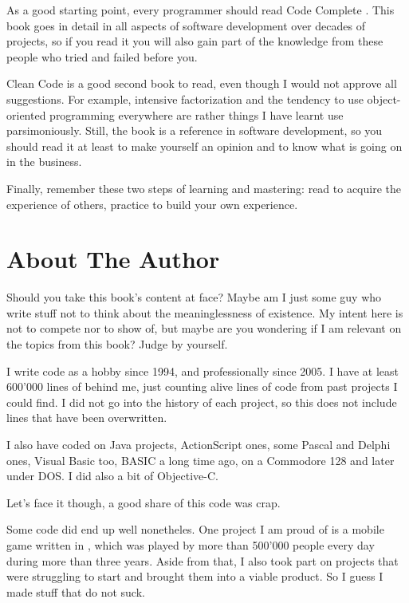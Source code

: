 As a good starting point, every programmer should read Code Complete
\cite{code-complete}. This book goes in detail in all aspects of
software development over decades of projects, so if you read it you
will also gain part of the knowledge from these people who tried and
failed before you.

Clean Code \cite{clean-code} is a good second book to read, even
though I would not approve all suggestions. For example, intensive
factorization and the tendency to use object-oriented programming
everywhere are rather things I have learnt use parsimoniously. Still,
the book is a reference in software development, so you should read it
at least to make yourself an opinion and to know what is going on in
the business.

\bigskip

Finally, remember these two steps of learning and mastering: read to
acquire the experience of others, practice to build your own
experience.

\section{About The Author}

Should you take this book's content at face? Maybe am I just some guy
who write stuff not to think about the meaninglessness of
existence. My intent here is not to compete nor to show of, but maybe
are you wondering if I am relevant on the topics from this book? Judge
by yourself.

I write code as a hobby since 1994, and professionally since 2005. I
have at least 600'000 lines of \cpp behind me, just counting alive
lines of code from past projects I could find. I did not go into the
history of each project, so this does not include lines that have been
overwritten.

I also have coded on Java projects, ActionScript ones, some Pascal and
Delphi ones, Visual Basic too, BASIC a long time ago, on a Commodore
128 and later under DOS. I did also a bit of Objective-C.

Let's face it though, a good share of this code was crap.

Some code did end up well nonetheles. One project I am proud of is a
mobile game written in \cpp, which was played by more than 500'000
people every day during more than three years. Aside from that, I also
took part on projects that were struggling to start and brought them
into a viable product. So I guess I made stuff that do not suck.

